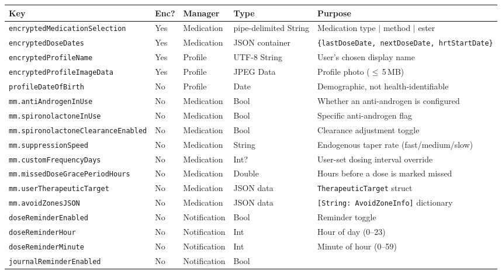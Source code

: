 \documentclass[11pt,a4paper]{article}
\newcommand{\code}[1]{\texttt{\small #1}}
\begin{document}
\begin{table}[h]
\centering
\small
\begin{longtable}{@{}p{3.4cm}p{1.2cm}p{2.4cm}p{2.2cm}p{5.3cm}@{}}
\toprule
\textbf{Key} & \textbf{Enc?} & \textbf{Manager} & \textbf{Type} & \textbf{Purpose} \\
\midrule
\endhead
\code{encryptedMedicationSelection} & Yes & Medication & pipe-delimited String &
  Medication type $|$ method $|$ ester \\
\code{encryptedDoseDates} & Yes & Medication & JSON container &
  \code{\{lastDoseDate, nextDoseDate, hrtStartDate\}} \\
\code{encryptedProfileName} & Yes & Profile & UTF-8 String &
  User's chosen display name \\
\code{encryptedProfileImageData} & Yes & Profile & JPEG Data &
  Profile photo ($\leq$\,5\,MB) \\
\midrule
\code{profileDateOfBirth} & No & Profile & Date &
  Demographic, not health-identifiable \\
\code{mm.antiAndrogenInUse} & No & Medication & Bool &
  Whether an anti-androgen is configured \\
\code{mm.spironolactoneInUse} & No & Medication & Bool &
  Specific anti-androgen flag \\
\code{mm.spironolactoneClearanceEnabled} & No & Medication & Bool &
  Clearance adjustment toggle \\
\code{mm.suppressionSpeed} & No & Medication & String &
  Endogenous taper rate (fast/medium/slow) \\
\code{mm.customFrequencyDays} & No & Medication & Int? &
  User-set dosing interval override \\
\code{mm.missedDoseGracePeriodHours} & No & Medication & Double &
  Hours before a dose is marked missed \\
\code{mm.userTherapeuticTarget} & No & Medication & JSON data &
  \code{TherapeuticTarget} struct \\
\code{mm.avoidZonesJSON} & No & Medication & JSON data &
  \code{[String: AvoidZoneInfo]} dictionary \\
\midrule
\code{doseReminderEnabled} & No & Notification & Bool &
  Reminder toggle \\
\code{doseReminderHour} & No & Notification & Int &
  Hour of day (0--23) \\
\code{doseReminderMinute} & No & Notification & Int &
  Minute of hour (0--59) \\
\code{journalReminderEnabled} & No & Notification & Bool &

\end{longtable}
\end{table}
\end{document}
